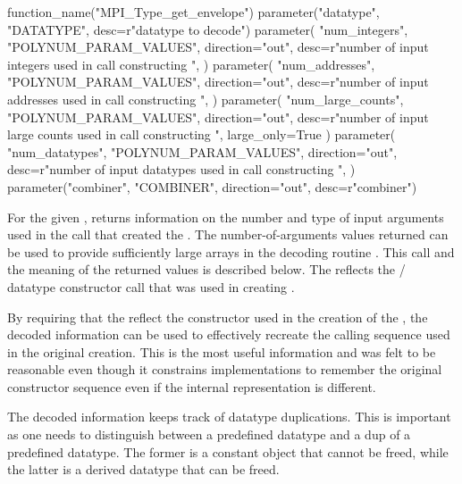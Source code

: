 \begin{mpi-binding}
    function_name("MPI_Type_get_envelope")
    parameter("datatype", "DATATYPE", desc=r"datatype to decode")
    parameter(
        "num_integers",
        "POLYNUM_PARAM_VALUES",
        direction="out",
        desc=r"number of input integers used in call constructing ",
    )
    parameter(
        "num_addresses",
        "POLYNUM_PARAM_VALUES",
        direction="out",
        desc=r"number of input addresses used in call constructing ",
    )
    parameter(
        "num_large_counts",
        "POLYNUM_PARAM_VALUES",
        direction="out",
        desc=r"number of input large counts used in call constructing ",
        large_only=True
    )
    parameter(
        "num_datatypes",
        "POLYNUM_PARAM_VALUES",
        direction="out",
        desc=r"number of input datatypes used in call constructing ",
    )
    parameter("combiner", "COMBINER", direction="out", desc=r"combiner")
\end{mpi-binding}

For the given ,
 returns information on the
number and type of input arguments used in the call that created the
.  The number-of-arguments values returned can be
used to provide sufficiently large arrays in the decoding routine
.  This call and the meaning of the
returned values is described below.  The  reflects
the \mpi/ datatype constructor call that was used in creating
.

\begin{rationale}
By requiring that the  reflect the constructor used
in the creation
of the , the decoded information can be used
to effectively recreate the calling sequence used in the original
creation.
This is the most useful information and
was
felt to be reasonable even though it constrains implementations to
remember the original constructor sequence even if the internal
representation is different.

The decoded information keeps track of datatype duplications.  This is
important as one needs to distinguish between a predefined datatype
and a dup of a predefined datatype.  The former is a constant object
that cannot be freed, while the latter is a derived datatype that can
be freed.
\end{rationale}


